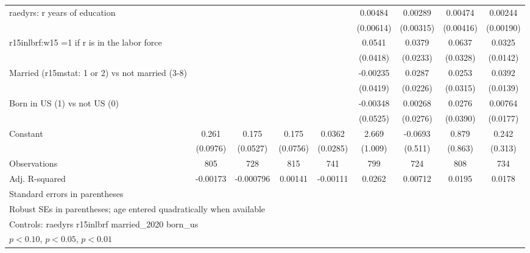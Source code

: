 \begin{table}[htbp]
\begin{tabular}{l*{8}{c}}
\addlinespace
raedyrs: r years of education&                  &                  &                  &                  &  0.00484         &  0.00289         &  0.00474         &  0.00244         \\
                &                  &                  &                  &                  &(0.00614)         &(0.00315)         &(0.00416)         &(0.00190)         \\
\addlinespace
r15inlbrf:w15 =1 if r is in the labor force&                  &                  &                  &                  &   0.0541         &   0.0379         &   0.0637\sym{*}  &   0.0325\sym{**} \\
                &                  &                  &                  &                  & (0.0418)         & (0.0233)         & (0.0328)         & (0.0142)         \\
\addlinespace
Married (r15mstat: 1 or 2) vs not married (3-8)&                  &                  &                  &                  & -0.00235         &   0.0287         &   0.0253         &   0.0392\sym{***}\\
                &                  &                  &                  &                  & (0.0419)         & (0.0226)         & (0.0315)         & (0.0139)         \\
\addlinespace
Born in US (1) vs not US (0)&                  &                  &                  &                  & -0.00348         &  0.00268         &   0.0276         &  0.00764         \\
                &                  &                  &                  &                  & (0.0525)         & (0.0276)         & (0.0390)         & (0.0177)         \\
\addlinespace
Constant        &    0.261\sym{***}&    0.175\sym{***}&    0.175\sym{**} &   0.0362         &    2.669\sym{***}&  -0.0693         &    0.879         &    0.242         \\
                & (0.0976)         & (0.0527)         & (0.0756)         & (0.0285)         &  (1.009)         &  (0.511)         &  (0.863)         &  (0.313)         \\
\midrule
Observations    &      805         &      728         &      815         &      741         &      799         &      724         &      808         &      734         \\
Adj. R-squared  & -0.00173         &-0.000796         &  0.00141         & -0.00111         &   0.0262         &  0.00712         &   0.0195         &   0.0178         \\
\bottomrule
\multicolumn{9}{l}{\footnotesize Standard errors in parentheses}\\
\multicolumn{9}{l}{\footnotesize Robust SEs in parentheses; age entered quadratically when available}\\
\multicolumn{9}{l}{\footnotesize Controls:  raedyrs r15inlbrf married\_2020 born\_us}\\
\multicolumn{9}{l}{\footnotesize \sym{*} \(p<0.10\), \sym{**} \(p<0.05\), \sym{***} \(p<0.01\)}\\
\end{tabular}
\end{table}
